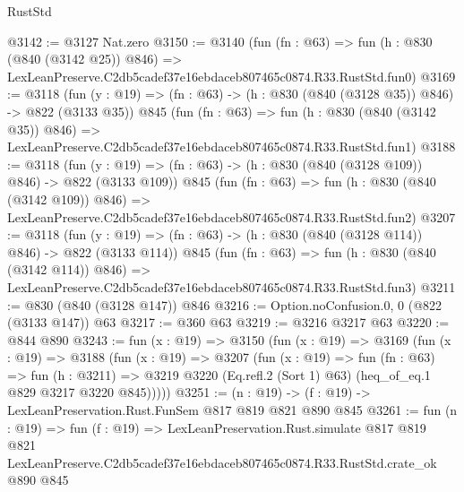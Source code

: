 \begin{lexlean}{RustStd}
\begin{coremodule}
@3142 := @3127 Nat.zero
@3150 := @3140
    (fun (fn : @63) =>
    fun (h : @830 (@840 (@3142 @25)) @846) =>
    LexLeanPreserve.C2db5cadef37e16ebdaceb807465c0874.R33.RustStd.fun0)
@3169 := @3118
    (fun (y : @19) => (fn : @63) -> (h : @830 (@840 (@3128 @35)) @846) -> @822 (@3133 @35))
    @845
    (fun (fn : @63) =>
    fun (h : @830 (@840 (@3142 @35)) @846) =>
    LexLeanPreserve.C2db5cadef37e16ebdaceb807465c0874.R33.RustStd.fun1)
@3188 := @3118
    (fun (y : @19) => (fn : @63) -> (h : @830 (@840 (@3128 @109)) @846) -> @822 (@3133 @109))
    @845
    (fun (fn : @63) =>
    fun (h : @830 (@840 (@3142 @109)) @846) =>
    LexLeanPreserve.C2db5cadef37e16ebdaceb807465c0874.R33.RustStd.fun2)
@3207 := @3118
    (fun (y : @19) => (fn : @63) -> (h : @830 (@840 (@3128 @114)) @846) -> @822 (@3133 @114))
    @845
    (fun (fn : @63) =>
    fun (h : @830 (@840 (@3142 @114)) @846) =>
    LexLeanPreserve.C2db5cadef37e16ebdaceb807465c0874.R33.RustStd.fun3)
@3211 := @830 (@840 (@3128 @147)) @846
@3216 := Option.noConfusion.{0, 0} (@822 (@3133 @147)) @63
@3217 := @360 @63
@3219 := @3216 @3217 @63
@3220 := @844 @890
@3243 := fun (x : @19) =>
  @3150
    (fun (x : @19) =>
    @3169
      (fun (x : @19) =>
      @3188
        (fun (x : @19) =>
        @3207
          (fun (x : @19) =>
          fun (fn : @63) =>
          fun (h : @3211) =>
          @3219 @3220 (Eq.refl.{2} (Sort 1) @63) (heq_of_eq.{1} @829 @3217 @3220 @845)))))
@3251 := (n : @19) -> (f : @19) -> LexLeanPreservation.Rust.FunSem @817 @819 @821 @890 @845
@3261 := fun (n : @19) =>
  fun (f : @19) =>
  LexLeanPreservation.Rust.simulate
    @817
    @819
    @821
    LexLeanPreserve.C2db5cadef37e16ebdaceb807465c0874.R33.RustStd.crate_ok
    @890
    @845
\end{coremodule}
\end{lexlean}
